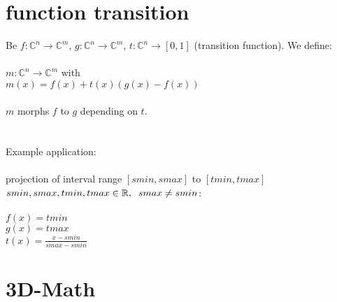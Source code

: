 \documentclass[a4paper]{article}
\newcommand{\spc}{\hspace{0.2cm}}
\begin{document}
\section{function transition}
Be $f:\mathbb{C}^n\rightarrow\mathbb{C}^m$, $g:\mathbb{C}^n\rightarrow\mathbb{C}^m$, $t:\mathbb{C}^n\rightarrow[0,1]$ (transition function). We define:\\\\
$m:\mathbb{C}^n\rightarrow\mathbb{C}^m$ with\\
$m(x)=f(x)+t(x)(g(x)-f(x))$
\\\\
$m$ morphs $f$ to $g$ depending on $t$.\\\\\\
Example application:\\\\
projection of interval range $[smin,smax]$ to $[tmin,tmax]$\\
$smin,smax,tmin,tmax\in\mathbb{R},\spc smax\not=smin$:\\\\
$f(x)=tmin$\\
$g(x)=tmax$\\
$t(x)=\frac{x-smin}{smax-smin}$

\newpage
\section{3D-Math}
\end{document}
